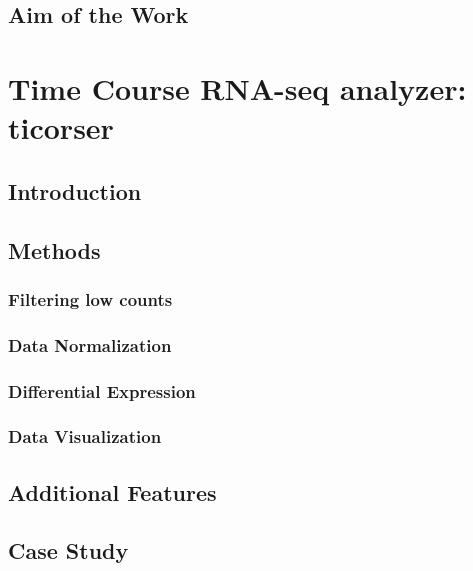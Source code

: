 \documentclass[b5paper, oneside, british, intoc, bibliograph=totoc, index=totoc, BCOR10mm, twoside, openright]{book}
\numberwithin{equation}{section}
\numberwithin{figure}{section}
\begin{document}
\section{Aim of the Work} \label{sec:reprres}



\chapter{Time Course RNA-seq analyzer: ticorser} \label{sec:ticorsercap}

\section{Introduction} \label{sec:ticorseintro}

\section{Methods} \label{sec:ticorseintromethods}

\subsection{Filtering low counts} \label{sec:ticorserfiltering}

\subsection{Data Normalization} \label{sec:ticorsernormalization}

\subsection{Differential Expression} \label{sec:ticorsermethods}

\subsection{Data Visualization} \label{sec:ticorserplots}

\section{Additional Features} \label{sec:ticorseraddfeat}

\section{Case Study} \label{sec:ticorseresults}

\end{document}
